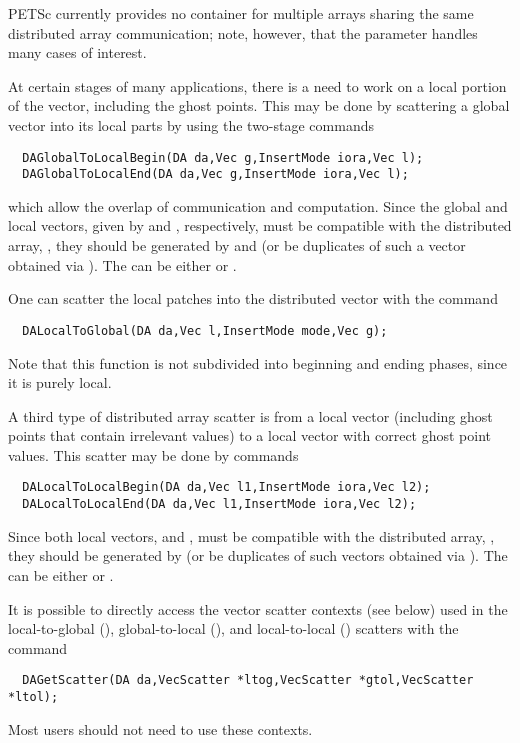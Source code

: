 PETSc currently provides no container for multiple arrays sharing the
same distributed array communication; note, however, that the 
parameter handles many cases of interest.

At certain stages of many applications, there is a need to work 
on a local portion of the vector, including the ghost points. 
This may be done by scattering a global vector into its 
local parts by using the two-stage commands
\begin{verbatim}
  DAGlobalToLocalBegin(DA da,Vec g,InsertMode iora,Vec l);
  DAGlobalToLocalEnd(DA da,Vec g,InsertMode iora,Vec l);
\end{verbatim}
which allow the overlap of communication and computation.
  
Since the global and local vectors, given by  and , respectively,
must be compatible with the distributed array, , they should be
generated by  
 and 
(or be duplicates of such a vector obtained via ).
The  can be either  or .

One can scatter the local patches into the distributed vector
with the command 
\begin{verbatim}
  DALocalToGlobal(DA da,Vec l,InsertMode mode,Vec g);
\end{verbatim}
Note that this function is not
subdivided into beginning and ending phases, since it is purely local.

A third type of distributed array scatter is from a local
vector (including ghost points that contain irrelevant values) to 
a local vector with correct ghost point values. 
This scatter may be done by 
commands 
\begin{verbatim}
  DALocalToLocalBegin(DA da,Vec l1,InsertMode iora,Vec l2);
  DALocalToLocalEnd(DA da,Vec l1,InsertMode iora,Vec l2);
\end{verbatim}
Since both local vectors,  and ,
must be compatible with the distributed array, , they should be
generated by  
(or be duplicates of such vectors obtained via ).
The  can be either  or .

It is possible to directly access the vector scatter contexts (see below)
used in the local-to-global (), global-to-local 
(), and local-to-local ()
scatters with the command 
\begin{verbatim}
  DAGetScatter(DA da,VecScatter *ltog,VecScatter *gtol,VecScatter *ltol);
\end{verbatim}
Most users should not need to use these contexts.

